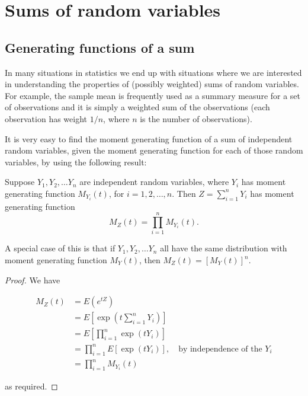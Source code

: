 \documentclass[]{book}
\theoremstyle{definition}
\theoremstyle{definition}
\theoremstyle{definition}
\theoremstyle{remark}
\let\BeginKnitrBlock\begin \let\EndKnitrBlock\end
\begin{document}
\chapter{Sums of random variables}\label{sums-of-random-variables}

\section{Generating functions of a
sum}\label{generating-functions-of-a-sum}

In many situations in statistics we end up with situations where we are
interested in understanding the properties of (possibly weighted) sums
of random variables. For example, the sample mean is frequently used as
a summary measure for a set of observations and it is simply a weighted
sum of the observations (each observation has weight \(1/n\), where
\(n\) is the number of observations).

It is very easy to find the moment generating function of a sum of
independent random variables, given the moment generating function for
each of those random variables, by using the following result:

\BeginKnitrBlock{theorem}
\protect\hypertarget{thm:mgfsum}{}{\label{thm:mgfsum} }Suppose
\(Y_1, Y_2, \ldots Y_n\) are independent random variables, where \(Y_i\)
has moment generating function \(M_{Y_i}(t)\), for
\(i = 1, 2, \ldots, n\). Then \(Z = \sum_{i=1}^n Y_i\) has moment
generating function \[M_Z(t) = \prod_{i=1}^n M_{Y_i}(t).\]
\EndKnitrBlock{theorem} \BeginKnitrBlock{remark}

\iffalse{} {Remark. } \fi{}A special case of this is that if
\(Y_1, Y_2, \ldots Y_n\) all have the same distribution with moment
generating function \(M_Y(t)\), then \(M_Z(t) = [M_Y(t)]^n\).
\EndKnitrBlock{remark} \BeginKnitrBlock{proof}

\iffalse{} {Proof. } \fi{}We have

\begin{align*}
M_Z(t) &= E(e^{tZ}) \\
&= E\left[\exp\left(t \sum_{i=1}^n Y_i \right)\right] \\
&= E\left[\prod_{i=1}^n \exp(t Y_i)\right] \\
&= \prod_{i=1}^n E\left[\exp(t Y_i)\right], \quad \text{by independence of the $Y_i$} \\
&= \prod_{i=1}^n M_{Y_i}(t)
\end{align*}

as required.
\EndKnitrBlock{proof}
\end{document}
